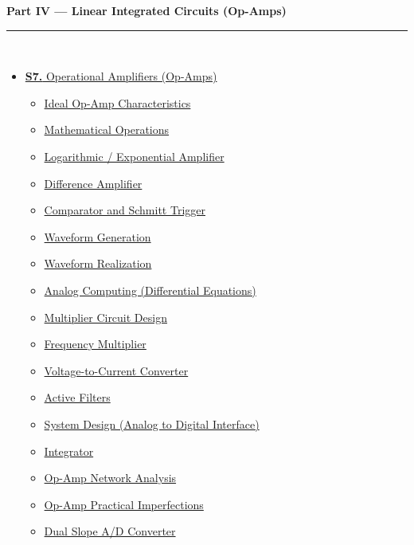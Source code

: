 \documentclass[12pt,a4paper]{article}
\begin{document}
\begin{tcolorbox}[breakable,colback=cE!5,colframe=cE,boxrule=1pt,arc=5pt,
  left=8pt,right=8pt,top=8pt,bottom=8pt,before skip=4pt]
  {\large\bfseries\textcolor{cE}{Part IV --- Linear Integrated Circuits (Op-Amps)}}\\[5pt]
  \textcolor{cE!40}{\rule{\textwidth}{0.4pt}}\\[3pt]
  \small\begin{itemize}[leftmargin=1.2em,itemsep=1pt,label={\textcolor{cE}{$\triangleright$}}]
    \item \hyperref[sec:S7]{\textbf{S7.} Operational Amplifiers (Op-Amps)}
      \begin{itemize}[leftmargin=1.5em,itemsep=0pt,label={\textcolor{cE}{$\cdot$}}]
        \item \hyperref[sub:s7-ideal]{Ideal Op-Amp Characteristics}
        \item \hyperref[sub:s7-math]{Mathematical Operations}
        \item \hyperref[sub:s7-log]{Logarithmic / Exponential Amplifier}
        \item \hyperref[sub:s7-diff]{Difference Amplifier}
        \item \hyperref[sub:s7-schmitt]{Comparator and Schmitt Trigger}
        \item \hyperref[sub:s7-wave]{Waveform Generation}
        \item \hyperref[sub:s7-wavereal]{Waveform Realization}
        \item \hyperref[sub:s7-analog]{Analog Computing (Differential Equations)}
        \item \hyperref[sub:s7-mult]{Multiplier Circuit Design}
        \item \hyperref[sub:s7-freqmult]{Frequency Multiplier}
        \item \hyperref[sub:s7-v2i]{Voltage-to-Current Converter}
        \item \hyperref[sub:s7-filters]{Active Filters}
        \item \hyperref[sub:s7-sysdesign]{System Design (Analog to Digital Interface)}
        \item \hyperref[sub:s7-integrator]{Integrator}
        \item \hyperref[sub:s7-network]{Op-Amp Network Analysis}
        \item \hyperref[sub:s7-imperfections]{Op-Amp Practical Imperfections}
        \item \hyperref[sub:s7-adc]{Dual Slope A/D Converter}
      \end{itemize}
  \end{itemize}
\end{tcolorbox}
\end{document}
